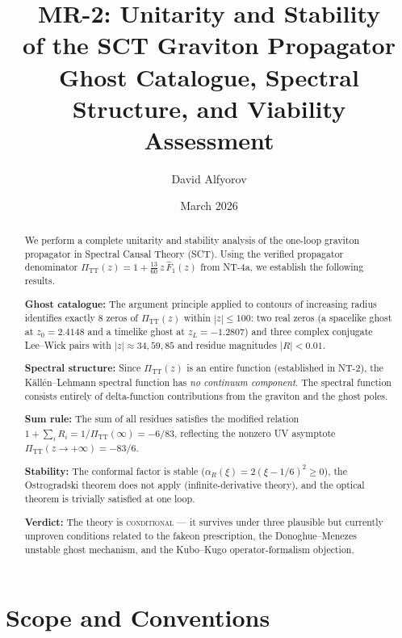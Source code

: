 \documentclass[11pt,a4paper]{article}
\title{%
  \textbf{MR-2: Unitarity and Stability}\\[4pt]
  \textbf{of the SCT Graviton Propagator}\\[6pt]
  \large Ghost Catalogue, Spectral Structure, and Viability Assessment
}
\author{David Alfyorov}
\date{March 2026}
\newcommand{\PiTT}{\Pi_{\mathrm{TT}}}
\newcommand{\Fhat}{\hat{F}}
\begin{document}
\maketitle

\begin{center}
\end{center}

\begin{abstract}
We perform a complete unitarity and stability analysis of the one-loop
graviton propagator in Spectral Causal Theory (SCT).  Using the verified
propagator denominator $\PiTT(z) = 1 + \tfrac{13}{60}\,z\,\Fhat_1(z)$
from NT-4a, we establish the following results.

\textbf{Ghost catalogue:} The argument principle applied to contours of
increasing radius identifies exactly 8 zeros of $\PiTT(z)$ within
$|z| \leq 100$: two real zeros (a spacelike ghost at $z_0 = 2.4148$ and
a timelike ghost at $z_L = -1.2807$) and three complex conjugate
Lee--Wick pairs with $|z| \approx 34, 59, 85$ and residue magnitudes
$|R| < 0.01$.

\textbf{Spectral structure:} Since $\PiTT(z)$ is an entire function
(established in NT-2), the K\"all\'en--Lehmann spectral function has
\emph{no continuum component}.  The spectral function consists entirely
of delta-function contributions from the graviton and the ghost poles.

\textbf{Sum rule:} The sum of all residues satisfies the modified
relation $1 + \sum_i R_i = 1/\PiTT(\infty) = -6/83$, reflecting the
nonzero UV asymptote $\PiTT(z \to +\infty) = -83/6$.

\textbf{Stability:} The conformal factor is stable ($\alpha_R(\xi) =
2(\xi - 1/6)^2 \geq 0$), the Ostrogradski theorem does not apply
(infinite-derivative theory), and the optical theorem is trivially
satisfied at one loop.

\textbf{Verdict:} The theory is \textsc{conditional} --- it survives
under three plausible but currently unproven conditions related to the
fakeon prescription, the Donoghue--Menezes unstable ghost mechanism,
and the Kubo--Kugo operator-formalism objection.
\end{abstract}

\tableofcontents
\newpage


\section{Scope and Conventions}
\label{sec:scope}
\end{document}
